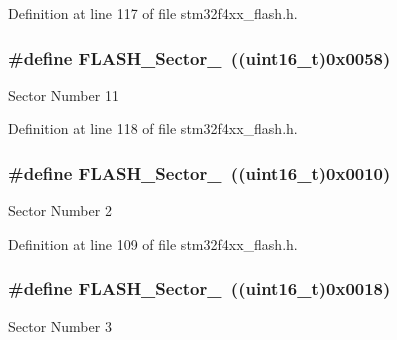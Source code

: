 Definition at line 117 of file stm32f4xx\-\_\-flash.\-h.

\hypertarget{group___f_l_a_s_h___sectors_gaac431a84bd33c70626b7981dcaf123b1}{
\subsubsection[{F\-L\-A\-S\-H\-\_\-\-Sector\-\_\-11}]{\setlength{\rightskip}{0pt plus 5cm}\#define F\-L\-A\-S\-H\-\_\-\-Sector\-\_~((uint16\-\_\-t)0x0058)}}\label{group___f_l_a_s_h___sectors_gaac431a84bd33c70626b7981dcaf123b1}
Sector Number 11 

Definition at line 118 of file stm32f4xx\-\_\-flash.\-h.

\hypertarget{group___f_l_a_s_h___sectors_ga9c5458f70e420e0715a7f268aff38fc1}{
\subsubsection[{F\-L\-A\-S\-H\-\_\-\-Sector\-\_\-2}]{\setlength{\rightskip}{0pt plus 5cm}\#define F\-L\-A\-S\-H\-\_\-\-Sector\-\_~((uint16\-\_\-t)0x0010)}}\label{group___f_l_a_s_h___sectors_ga9c5458f70e420e0715a7f268aff38fc1}
Sector Number 2 

Definition at line 109 of file stm32f4xx\-\_\-flash.\-h.

\hypertarget{group___f_l_a_s_h___sectors_ga64cfe33ec785060ce70034df6534a656}{
\subsubsection[{F\-L\-A\-S\-H\-\_\-\-Sector\-\_\-3}]{\setlength{\rightskip}{0pt plus 5cm}\#define F\-L\-A\-S\-H\-\_\-\-Sector\-\_~((uint16\-\_\-t)0x0018)}}\label{group___f_l_a_s_h___sectors_ga64cfe33ec785060ce70034df6534a656}
Sector Number 3 

